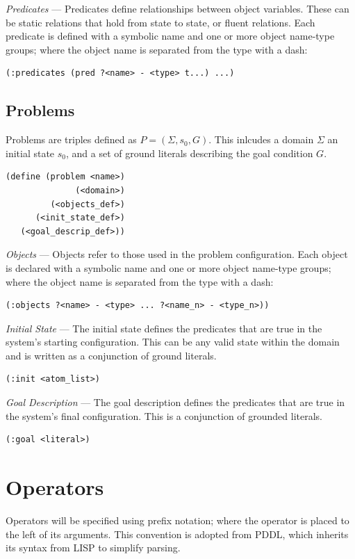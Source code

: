 \documentclass[
a4paper, %
11pt, %
onecolumn, %
openany, %
]{memoir}
\begin{document}
{\textit{Predicates} --- Predicates define relationships between object variables. These can be static relations that hold from state to state, or fluent relations. Each predicate is defined with a symbolic name and one or more object name-type groups; where the object name is separated from the type with a dash:

\begin{lstlisting}
(:predicates (pred ?<name> - <type> t...) ...)
\end{lstlisting}

\subsection{Problems}
Problems are triples defined as $P = (\Sigma, s_0, G)$. This inlcudes a domain $\Sigma$ an initial state $s_0$, and a set of ground literals describing the goal condition $G$.

\begin{lstlisting}
(define (problem <name>)
              (<domain>)
         (<objects_def>)
      (<init_state_def>)
   (<goal_descrip_def>))
\end{lstlisting}

\textit{Objects} --- Objects refer to those used in the problem configuration. Each object is declared with a symbolic name and one or more object name-type groups; where the object name is separated from the type with a dash:


\begin{lstlisting}
(:objects ?<name> - <type> ... ?<name_n> - <type_n>))
\end{lstlisting}

\textit{Initial State} --- The initial state defines the predicates that are true in the system's starting configuration. This can be any valid state within the domain and is written as a conjunction of ground literals.

\begin{lstlisting}
(:init <atom_list>)
\end{lstlisting}

\textit{Goal Description} --- The goal description defines the predicates that are true in the system's final configuration. This is a conjunction of grounded literals.

\begin{lstlisting}
(:goal <literal>)
\end{lstlisting}
}

\section{Operators}
Operators will be specified using prefix notation; where the operator is placed to the left of its arguments. This convention is adopted from PDDL, which inherits its syntax from LISP to simplify parsing.\\
\end{document}
